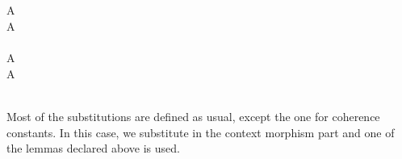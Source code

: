 \documentclass{sig-alternate}
\begin{document}
{\begin{code}
\\
%
\\
%
\\
\> \AgdaSymbol{:}    \AgdaSymbol{:} \AgdaSymbol{\}\{} \AgdaSymbol{:}   \AgdaSymbol{\}\{} \AgdaSymbol{:}   \AgdaSymbol{\}\{} \AgdaSymbol{:}   \AgdaSymbol{\}\{} \AgdaSymbol{:}  \AgdaSymbol{\}}\<%
\\
\>[0]\<[7]%
\>[7]     \<%
\\
\>[0]\<[7]%
\>[7]   \AgdaSymbol{(}  \AgdaSymbol{)}    \<%
\\
\>  \AgdaSymbol{=}   \AgdaSymbol{(}      \AgdaSymbol{\_)} \AgdaSymbol{)}\<%
\\
%
\\
%
\\
\> \AgdaSymbol{\{}A \AgdaSymbol{=} \AgdaInductiveConstructor{*}\AgdaSymbol{\}} \AgdaSymbol{=} \<%
\\
\> \AgdaSymbol{\{}A \AgdaSymbol{=}  \AgdaSymbol{\{}\AgdaSymbol{\}}  \AgdaSymbol{\}} \AgdaSymbol{=}  \AgdaSymbol{(} \AgdaSymbol{\_)} \AgdaSymbol{(} \AgdaSymbol{\_)} \<[51]%
\>[51]\<%
\\
%
\\
\> \AgdaSymbol{\{}A \AgdaSymbol{=} \AgdaInductiveConstructor{*}\AgdaSymbol{\}} \AgdaSymbol{=} \<%
\\
\> \AgdaSymbol{\{}A \AgdaSymbol{=}  \AgdaSymbol{\{}\AgdaSymbol{\}}  \AgdaSymbol{\}} \AgdaSymbol{=}  \<[34]%
\>[34]\AgdaSymbol{(} \AgdaSymbol{\_)} \AgdaSymbol{(} \AgdaSymbol{\_)}\<%
\\
%
\\
\>\<\end{code}
}
Most of the substitutions are defined as usual, except the one for coherence constants. In this case, we substitute in the context morphism part and one of the lemmas declared above is used.
\end{document}
